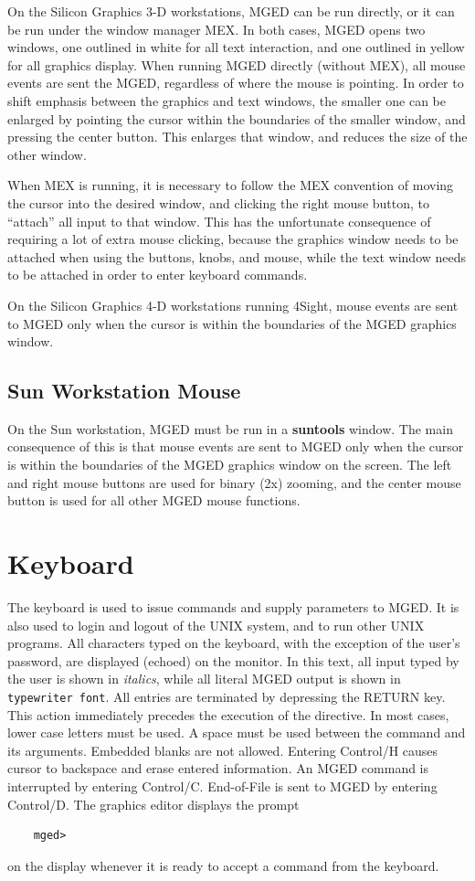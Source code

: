 On the Silicon Graphics 3-D workstations, MGED can be run directly,
or it can be run under the window manager MEX.  In both cases,
MGED opens two windows, one outlined in white for all text interaction,
and one outlined in yellow for all graphics display.
When running MGED directly (without MEX), all mouse events are
sent the MGED, regardless of where the mouse is pointing.
In order to shift emphasis between the graphics and text windows,
the smaller one can be enlarged by pointing the cursor within the
boundaries of the smaller window, and pressing the center button.
This enlarges that window, and reduces the size of the other window.

When MEX is running, it is necessary to follow the MEX convention of
moving the cursor into the desired window, and clicking the right mouse
button, to ``attach'' all input to that window.
This has the unfortunate consequence of requiring a lot of extra
mouse clicking, because the graphics window needs to be attached
when using the buttons, knobs, and mouse, while the text window
needs to be attached in order to enter keyboard commands.

On the Silicon Graphics 4-D workstations running 4Sight,
mouse events are sent to MGED only when the cursor is within the
boundaries of the MGED graphics window.

\subsection{Sun Workstation Mouse}

On the Sun workstation, MGED must be run in a {\bf suntools} window.
The main consequence of this is that mouse events are sent to MGED
only when the cursor is within the boundaries of the MGED graphics window
on the screen.
The left and right mouse buttons are used for binary (2x) zooming,
and the center mouse button is used for all other MGED mouse functions.

\section{Keyboard}

The keyboard is used to issue commands and supply parameters to MGED.
It is also used to login and logout of the UNIX system, and to
run other UNIX programs.
All characters typed on the keyboard,
with the exception of the user's password, are displayed (echoed) on the
monitor.
In this text, all input typed by the user is
shown in {\em italics}, while all literal MGED output
is shown in {\tt typewriter font}.
All entries are
terminated by depressing the RETURN key.
This action immediately precedes the execution of the directive.
In most cases, lower case letters
must be used.  A space must be used between the command and its
arguments.
Embedded blanks are not allowed.
Entering Control/H causes cursor to backspace and erase entered
information.
An MGED command is interrupted by entering Control/C.
End-of-File is sent to MGED by entering Control/D.
The graphics editor displays the prompt
\begin{verbatim}
	mged>
\end{verbatim}
on the display whenever it is ready to accept a command from the keyboard.

